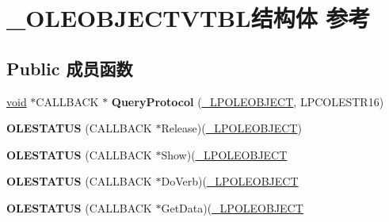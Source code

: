 \hypertarget{struct___o_l_e_o_b_j_e_c_t_v_t_b_l}{}\section{\+\_\+\+O\+L\+E\+O\+B\+J\+E\+C\+T\+V\+T\+B\+L结构体 参考}
\label{struct___o_l_e_o_b_j_e_c_t_v_t_b_l}
\subsection*{Public 成员函数}
\begin{DoxyCompactItemize}
\item 
\mbox{\label{struct___o_l_e_o_b_j_e_c_t_v_t_b_l_aca2712796b72b0927cda4e924be3c248}} 
\hyperlink{interfacevoid}{void} $\ast$C\+A\+L\+L\+B\+A\+CK $\ast$ {\bfseries Query\+Protocol} (\hyperlink{struct___o_l_e_o_b_j_e_c_t}{\+\_\+\+L\+P\+O\+L\+E\+O\+B\+J\+E\+CT}, L\+P\+C\+O\+L\+E\+S\+T\+R16)
\item 
\mbox{\label{struct___o_l_e_o_b_j_e_c_t_v_t_b_l_a8814588194730f87445ddc95daff19b4}} 
{\bfseries O\+L\+E\+S\+T\+A\+T\+US} (C\+A\+L\+L\+B\+A\+CK $\ast$Release)(\hyperlink{struct___o_l_e_o_b_j_e_c_t}{\+\_\+\+L\+P\+O\+L\+E\+O\+B\+J\+E\+CT})
\item 
\mbox{\label{struct___o_l_e_o_b_j_e_c_t_v_t_b_l_a6fa751f51eb3566c5e784d1020637f24}} 
{\bfseries O\+L\+E\+S\+T\+A\+T\+US} (C\+A\+L\+L\+B\+A\+CK $\ast$Show)(\hyperlink{struct___o_l_e_o_b_j_e_c_t}{\+\_\+\+L\+P\+O\+L\+E\+O\+B\+J\+E\+CT}
\item 
\mbox{\label{struct___o_l_e_o_b_j_e_c_t_v_t_b_l_a1545f0e720fbb7a587d30c47d6ef4d73}} 
{\bfseries O\+L\+E\+S\+T\+A\+T\+US} (C\+A\+L\+L\+B\+A\+CK $\ast$Do\+Verb)(\hyperlink{struct___o_l_e_o_b_j_e_c_t}{\+\_\+\+L\+P\+O\+L\+E\+O\+B\+J\+E\+CT}
\item 
\mbox{\label{struct___o_l_e_o_b_j_e_c_t_v_t_b_l_a1321ca6f3fc0000f7f601c8dd0ab58e9}} 
{\bfseries O\+L\+E\+S\+T\+A\+T\+US} (C\+A\+L\+L\+B\+A\+CK $\ast$Get\+Data)(\hyperlink{struct___o_l_e_o_b_j_e_c_t}{\+\_\+\+L\+P\+O\+L\+E\+O\+B\+J\+E\+CT}
\item 
\mbox{\label{struct___o_l_e_o_b_j_e_c_t_v_t_b_l_ad2ef94aaaa345c93e2eacf966814c7ff}} 

\end{DoxyCompactItemize}
